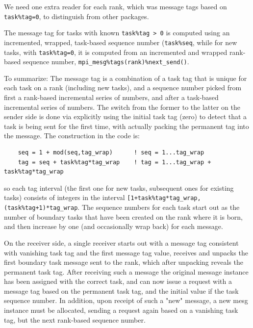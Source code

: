\documentclass[paper=a4,fontsize=11pt]{scrartcl}
\numberwithin{equation}{section}		%
\numberwithin{figure}{section}			%
\numberwithin{table}{section}				%
\newcommand{\codecolor}{\color{Blue}}
\newcommand{\Code}[1]{{\codecolor\texttt{#1}}}
\begin{document}
We need one extra reader for each rank, which was message tags based on \Code{task\%tag=0}, to distinguish from other packages.

The message tag for tasks with known \Code{task\%tag > 0} is computed using an incremented, wrapped, task-based sequence number (\Code{task\%seq}, while for new tasks, with \Code{task\%tag=0}, it is computed from an incremented and wrapped rank-based sequence number, \Code{mpi\_mesg\%tags(rank)\%next\_send()}.

To summarize:  The message tag is a combination of a task tag that is unique for each task on a rank (including new tasks), and a sequence number picked from first a rank-based incremental series of numbers, and after a task-based incremental series of numbers.  The switch from the former to the latter on the sender side is done via explicitly using the initial task tag (zero) to detect that a task is being sent for the first time, with actually packing the permanent tag into the message.  The construction in the code is:
{\codecolor\begin{verbatim}
    seq = 1 + mod(seq,tag_wrap)      ! seq = 1...tag_wrap
    tag = seq + task%tag*tag_wrap    ! tag = 1...tag_wrap + task%tag*tag_wrap
\end{verbatim}}
so each tag interval (the first one for new tasks, subsequent ones for existing tasks) consists of integers in the interval \verb'[1+task%tag*tag_wrap, (task%tag+1)*tag_wrap'.  The sequence numbers for each task start out as the number of boundary tasks that have been created on the rank where it is born, and then increase by one (and occasionally wrap back) for each message.

On the receiver side, a single receiver starts out with a message tag consistent with vanishing task tag and the first message tag value, receives and unpacks the first boundary task message sent to the rank, which after unpacking reveals the permanent task tag.  After receiving such a message the original message instance has been assigned with the correct task, and can now issue a request with a message tag based on the permanent task tag, and the initial value if the task sequence number.  In addition, upon receipt of such a "new" message, a new mesg instance must be allocated, sending a request again based on a vanishing task tag, but the next rank-based sequence number. 

\end{document}

